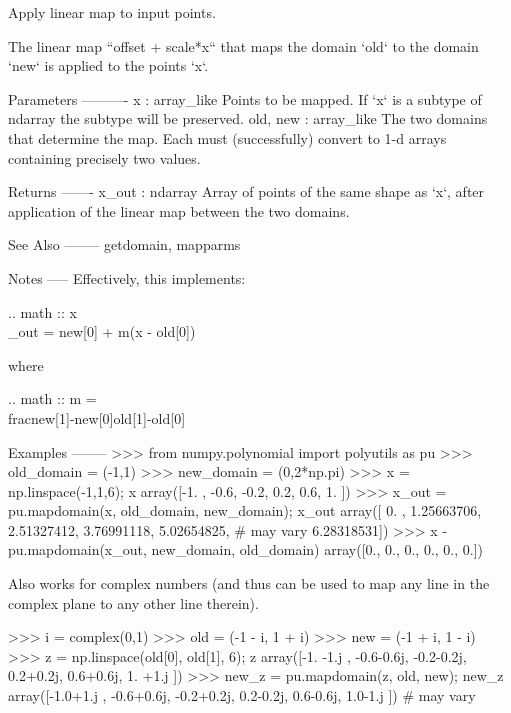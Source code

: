 \begin{DoxyVerb}Apply linear map to input points.

The linear map ``offset + scale*x`` that maps the domain `old` to
the domain `new` is applied to the points `x`.

Parameters
----------
x : array_like
    Points to be mapped. If `x` is a subtype of ndarray the subtype
    will be preserved.
old, new : array_like
    The two domains that determine the map.  Each must (successfully)
    convert to 1-d arrays containing precisely two values.

Returns
-------
x_out : ndarray
    Array of points of the same shape as `x`, after application of the
    linear map between the two domains.

See Also
--------
getdomain, mapparms

Notes
-----
Effectively, this implements:

.. math ::
    x\\_out = new[0] + m(x - old[0])

where

.. math ::
    m = \\frac{new[1]-new[0]}{old[1]-old[0]}

Examples
--------
>>> from numpy.polynomial import polyutils as pu
>>> old_domain = (-1,1)
>>> new_domain = (0,2*np.pi)
>>> x = np.linspace(-1,1,6); x
array([-1. , -0.6, -0.2,  0.2,  0.6,  1. ])
>>> x_out = pu.mapdomain(x, old_domain, new_domain); x_out
array([ 0.        ,  1.25663706,  2.51327412,  3.76991118,  5.02654825, # may vary
        6.28318531])
>>> x - pu.mapdomain(x_out, new_domain, old_domain)
array([0., 0., 0., 0., 0., 0.])

Also works for complex numbers (and thus can be used to map any line in
the complex plane to any other line therein).

>>> i = complex(0,1)
>>> old = (-1 - i, 1 + i)
>>> new = (-1 + i, 1 - i)
>>> z = np.linspace(old[0], old[1], 6); z
array([-1. -1.j , -0.6-0.6j, -0.2-0.2j,  0.2+0.2j,  0.6+0.6j,  1. +1.j ])
>>> new_z = pu.mapdomain(z, old, new); new_z
array([-1.0+1.j , -0.6+0.6j, -0.2+0.2j,  0.2-0.2j,  0.6-0.6j,  1.0-1.j ]) # may vary\end{DoxyVerb}
 \mbox{\label{namespacenumpy_1_1polynomial_1_1polyutils_a08c57061ab874647b21eb3faf330bd34}} 
